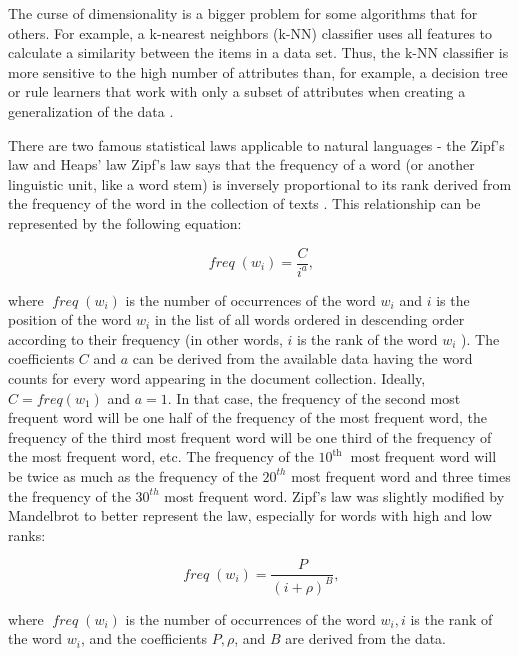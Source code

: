 \documentclass[11pt,openany,executivepaper]{book}
\begin{document}
The curse of dimensionality is a bigger problem for some algorithms that for others. For example, a k-nearest neighbors (k-NN) classifier uses all features to calculate a similarity between the items in a data set. Thus, the k-NN classifier is more sensitive to the high number of attributes than, for example, a decision tree or rule learners that work with only a subset of attributes when creating a generalization of the data \cite{199}.

There are two famous statistical laws applicable to natural languages - the Zipf's law and Heaps' law Zipf's law says that the frequency of a word (or another linguistic unit, like a word stem) is inversely proportional to its rank derived from the frequency of the word in the collection of texts \cite{186}. This relationship can be represented by the following equation:


\begin{equation*}
\operatorname{\textit{freq}}\left(w_{i}\right)=\frac{C}{i^{a}}, \tag{3.1}
\end{equation*}


where $\operatorname{\textit{freq}}\left(w_{i}\right)$ is the number of occurrences of the word $w_{i}$ and $i$ is the position of the word $w_{i}$ in the list of all words ordered in descending order according to their frequency (in other words, $i$ is the rank of the word $w_{i}$ ). The coefficients $C$ and $a$ can be derived from the available data having the word counts for every word appearing in the document collection. Ideally, $C=f r e q\left(w_{1}\right)$ and $a=1$. In that case, the frequency of the second most frequent word will be one half of the frequency of the most frequent word, the frequency of the third most frequent word will be one third of the frequency of the most frequent word, etc. The frequency of the $10^{\text {th }}$ most frequent word will be twice as much as the frequency of the $20^{t h}$ most frequent word and three times the frequency of the $30^{t h}$ most frequent word. Zipf's law was slightly modified by Mandelbrot \cite{184} to better represent the law, especially for words with high and low ranks:


\begin{equation*}
\operatorname{\textit{freq}}\left(w_{i}\right)=\frac{P}{(i+\rho)^{B}}, \tag{3.2}
\end{equation*}


where $\operatorname{\textit{freq}}\left(w_{i}\right)$ is the number of occurrences of the word $w_{i}, i$ is the rank of the word $w_{i}$, and the coefficients $P, \rho$, and $B$ are derived from the data.
\end{document}

